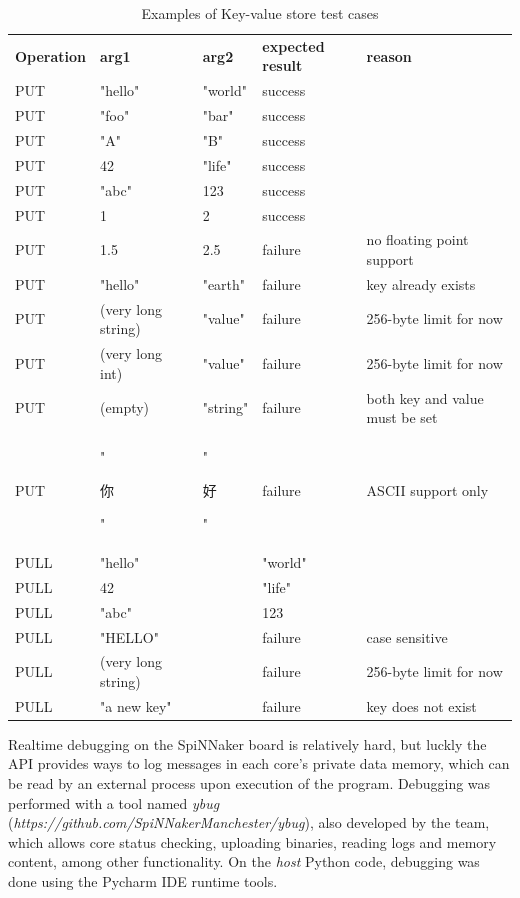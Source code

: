 \begin{table}
\begin{tabular}{ l | l | l | l | l }
\textbf{Operation} & \textbf{arg1} & \textbf{arg2} & \textbf{expected result} & \textbf{reason} \\
PUT & "hello" & "world" & success & \\
PUT & "foo" & "bar" & success & \\
PUT & "A" & "B" & success & \\
PUT & 42 & "life" & success & \\
PUT & "abc" & 123 &  success & \\
PUT & 1 & 2 & success & \\
PUT & 1.5 & 2.5 & failure & no floating point support\\
PUT & "hello" & "earth" & failure & key already exists \\
PUT & (very long string) & "value" & failure & 256-byte limit for now \\
PUT & (very long int) & "value" & failure & 256-byte limit for now \\
PUT & (empty) & "string" & failure & both key and value must be set \\
PUT & "\begin{CJK*}{UTF8}{bsmi}你\end{CJK*}" & "\begin{CJK*}{UTF8}{bsmi}好\end{CJK*}" & failure & ASCII support only \\
PULL & "hello" & & "world" & \\
PULL & 42 & & "life" & \\
PULL & "abc" & & 123 & \\
PULL & "HELLO" & & failure & case sensitive \\
PULL & (very long string) & & failure & 256-byte limit for now \\
PULL & "a new key" & & failure & key does not exist \\
\end{tabular}
\caption{Examples of Key-value store test cases}
\label{table:tests}
\end{table}

Realtime debugging on the SpiNNaker board is relatively hard, but luckly the API provides ways to log messages in each core's private data memory, which can be read by an external process upon execution of the program. Debugging was performed with a tool named \textit{ybug} (\textit{https://github.com/SpiNNakerManchester/ybug}), also developed by the team, which allows core status checking, uploading binaries, reading logs and memory content, among other functionality.\cite{ybug} On the \textit{host} Python code, debugging was done using the Pycharm IDE runtime tools.

